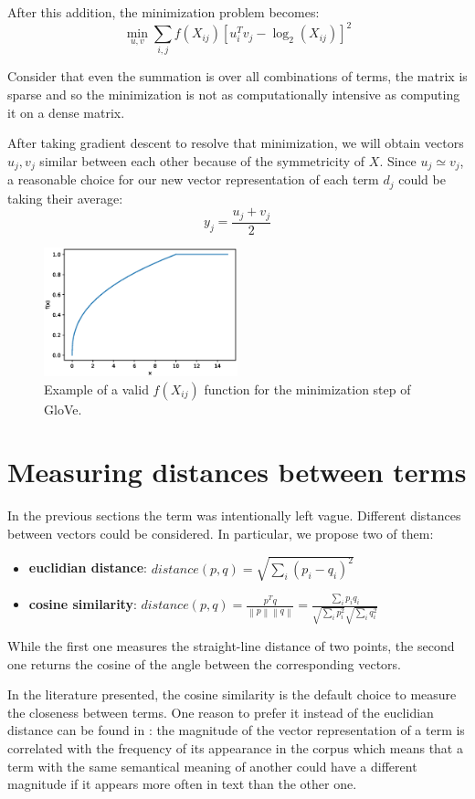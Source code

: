 After this addition, the minimization problem becomes:
\[ \displaystyle \min_{u,v} \sum_{i,j} f(X_{ij}) [u_i^T v_j - \log_2(X_{ij})]^2 \]

Consider that even the summation is over all combinations of terms,
the matrix is sparse and so the minimization is not as computationally intensive
as computing it on a dense matrix.

After taking gradient descent to resolve that minimization, we will obtain vectors
$u_j, v_j$ similar between each other because of the symmetricity of $X$.
Since $u_j \simeq v_j$, a reasonable choice for our new vector representation of
each term $d_j$ could be taking their average:
\[y_j = \frac{u_j + v_j}{2}\]

\begin{figure}[h]
    \centering
    \includegraphics[width=0.5\textwidth]{images/glovef}
    \caption{Example of a valid $f(X_{ij})$ function for the minimization step of GloVe.}
    \label{fig:glovef}
\end{figure}

\section{Measuring distances between terms}
In the previous sections the term  was intentionally left vague.
Different distances between vectors could be considered.
In particular, we propose two of them:
\begin{itemize}
    \item \textbf{euclidian distance}: $\mathit{distance}(p, q) = \sqrt{\sum_i (p_i - q_i)^2}$
    \item \textbf{cosine similarity}: $\mathit{distance}(p, q) = \frac{p^T q}{\left\lVert p \right\rVert \left\lVert q \right\rVert} = \frac{\sum_i p_i q_i}{\sqrt{\sum_i p_i^2} \sqrt{\sum_i q_i^2}}$
\end{itemize}

While the first one measures the straight-line distance of two points, the second one returns the cosine of the angle between the corresponding vectors.

In the literature presented, the cosine similarity is the default choice to measure the closeness between terms.
One reason to prefer it instead of the euclidian distance
can be found in \cite{DBLP:journals/corr/SchakelW15}: the magnitude of the vector representation of a term
is correlated with the frequency of its appearance in the corpus which means that
a term with the same semantical meaning of another could have a different
magnitude if it appears more often in text than the other one.